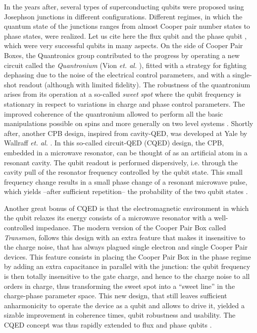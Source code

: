 In the years after, several types of superconducting qubits were proposed
using Josephson junctions in different configurations. Different regimes,
in which the quantum state of the junctions ranges from almost Cooper
pair number states to phase states, were realized. Let us cite here
the flux qubit \citep{mooij_josephson_1999, chiorescu_coherent_2003}
and the phase qubit \citep{martinis_rabi_2002}, which were very
successful qubits in many aspects. On the side of Cooper Pair Boxes,
the Quantronics group contributed to the progress by operating a
new circuit called the \textit{Quantronium} (Vion {\it et. al.} \citep{vion_manipulating_2002}),
fitted with a strategy for fighting dephasing due to the noise of
the electrical control parameters, and with a single-shot
readout (although with limited fidelity). The robustness of the quantronium
arises from its operation at a so-called {\it sweet spot} where the qubit
frequency is stationary in respect to variations in charge and phase control parameters. The improved coherence of
the quantronium allowed to perform all the basic manipulations possible
on spins and more generally on two level systems \citep{collin_nmr-like_2004}.
Shortly after, another CPB design, inspired from
cavity-QED, was developed at Yale by Wallraff {\it et. al.} \citep{wallraff_strong_2004}.
In this so-called circuit-QED (CQED) design, the
CPB, embedded in a microwave resonator, can be thought of as an artificial
atom in a resonant cavity. The qubit readout is performed
dispersively, i.e. through the cavity pull of the resonator frequency
controlled by the qubit state. This small frequency change results
in a small phase change of a resonant microwave pulse, which yields
--after sufficient repetition-- the probability of the two qubit states
\citep{blais_cavity_2004}.

\smallskip{}


Another great bonus of CQED is that the electromagnetic
environment in which the qubit relaxes its energy consists of a microwave
resonator with a well-controlled impedance. The modern
version of the Cooper Pair Box called \textit{Transmon}, follows this
design with an extra feature that makes it insensitive to the charge
noise, that has always plagued single electron and single Cooper Pair devices.
This feature consists in placing the Cooper Pair
Box in the phase regime by adding an extra capacitance in
parallel with the junction: the qubit frequency is then
totally insensitive to the gate charge, and hence to the charge noise to all orders in charge, thus transforming the sweet spot into a ``sweet line'' in the charge-phase parameter space.
This new design, that still leaves sufficient anharmonicity
to operate the device as a qubit and allows to drive it, yielded a
sizable improvement in coherence times, qubit robustness and usability.
The CQED concept was thus rapidly extended to flux and phase qubits \citep{hofheinz_synthesizing_2009}.


